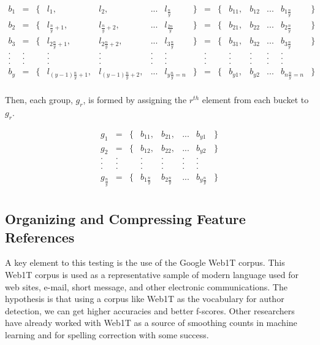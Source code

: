 	\begin{equation}
	\begin{array}{lclllclrcllllclr}
	b_1	& =	& \{	& l_1,				& l_2,				& ...	& l_{\frac{n}{y}}	& \}	& =	& \{ 	& b_{11},	& b_{12}	& ...	& b_{1 \frac{n}{y}} 	& \}	\\
	b_2	& =	& \{ 	& l_{\frac{n}{y}+1},		& l_{\frac{n}{y}+2},		& ...	& l_{\frac{2n}{y}}	& \}	& =	& \{ 	&  b_{21},	& b_{22}	& ...	& b_{2 \frac{n}{y}}	& \}	\\
	b_3	& =	& \{	& l_{2\frac{n}{y}+1},		& l_{2\frac{n}{y}+2},		& ...	& l_{3\frac{n}{y}}	& \}	& =	& \{ 	& b_{31},	& b_{32}	& ...	& b_{3 \frac{n}{y}}	& \}	\\
	.	& .	& 	& .				& .				& .	& .			& 	& .	&	& .		& .		& . 	& .			&	\\
	.	& .	& 	& .				& .				& .	& .			& 	& .	&	& .		& .		& . 	& .			&	\\
	.	& .	& 	& .				& .				& .	& .			& 	& .	&	& .		& .		& . 	& .			&	\\
	b_y	& =	& \{ 	& l_{(y-1)\frac{n}{y}+1},	& l_{(y-1)\frac{n}{y}+2},	& ...	& l_{y\frac{n}{y}=n} 	& \}	& =	& \{  	& b_{y1},	& b_{y2}	& ...	& b_{n\frac{n}{y}=n}	& \}	\\
	
	\end{array}
	\end{equation}
	
	Then, each group, $g_r$, is formed by assigning the $r^{th}$ element from each bucket to $g_r$.
	
	\begin{equation}
	\begin{array}{lclllclr}
	g_1		& =	& \{	& b_{11},		& b_{21},		& ...	& b_{y1}		& \}	\\
	g_2		& =	& \{	& b_{12},		& b_{22},		& ...	& b_{y2}		& \}	\\
	.		& .	&	& .			& .			& .	& .			& 	\\
	.		& .	&	& .			& .			& .	& .			& 	\\
	.		& .	&	& .			& .			& .	& .			& 	\\
	g_{\frac{n}{y}}	& =	& \{	& b_{1\frac{n}{y}}	& b_{2\frac{n}{y}}	& ...	& b_{y\frac{n}{y}}	& \}	\\
	\end{array}
	\end{equation}
	
	\subsection{Organizing and Compressing Feature References} A key element to this testing is the use of the Google Web1T corpus.  This Web1T corpus is used as a representative sample of modern language used for web sites, e-mail, short message, and other electronic communications.  The hypothesis is that using a corpus like Web1T as the vocabulary for author detection, we can get higher accuracies and better f-scores. Other researchers have already worked with Web1T as a source of smoothing counts in machine learning \cite{yuret_smoothing_2008} and for spelling correction\cite{islam_real-word_2009} with some success. 
